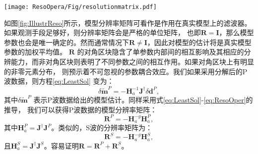 \begin{figure*}
    \begin{center}
        \texttt{[image: ResoOpera/Fig/resolutionmatrix.pdf]}
        \caption{
Schematic illustration of the resolution matrix.
The resolution matrix can be divided into four blocks for the inverse problem of two physical parameters.
    }
    \label{fig:IllustrReso}
    \end{center}
\end{figure*}
如图\ref{fig:IllustrReso}所示，模型分辨率矩阵可看作是作用在真实模型上的滤波器。如果观测手段足够好，则分辨率矩阵会是严格的单位矩阵，
也即$\mathbf{R}=\mathbf{I}$，那么模型参数也会是唯一确定的。然而通常情况下$\mathbf{R} \ne \mathbf{I}$，因此对模型的估计将是真实模型参数的加权平均值。
$\mathbf{R}$ 的对角区块隐含了单参数内部间的相互影响及其相应的分辨能力，而非对角区块则表明了不同参数之间的相互作用。如果对角区块上有明显的非零元素分布，
则预示着不可忽视的参数耦合效应。我们如果采用分解后的P波数据，则方程\eqref{eq:LeastSol} 变为：
\begin{equation}
        \delta \mathbf{\tilde{m}}^P=-\mathbf{H}^{-1}_a\mathbf{J}^{\dagger}\delta \mathbf{d}^P,
        \label{eq:LeastSolP}
\end{equation}
其中$\delta \mathbf{\tilde{m}}^P$ 表示P波数据给出的模型估计。同样采用式\eqref{eq:LeastSol}-\eqref{eq:ResoOper}的推导，
我们可以获得P波数据的模型分辨率矩阵：
\begin{equation}
        \mathbf{R}^P=-\mathbf{H}^{-g}_a\mathbf{H}_a^P,
        \label{eq:ResoOperP}
\end{equation}
其中$\mathbf{H}_a^P=\mathbf{J}^{\dagger}\mathbf{J}^P$。类似的，S波的分辨率矩阵为：
\begin{equation}
        \mathbf{R}^S=-\mathbf{H}^{-g}_a\mathbf{H}_a^S,
        \label{eq:ResoOperS}
\end{equation}
且$\mathbf{H}_a^S=\mathbf{J}^{\dagger}\mathbf{J}^S$。容易证明$\mathbf{R}=\mathbf{R}^P+\mathbf{R}^S$。

